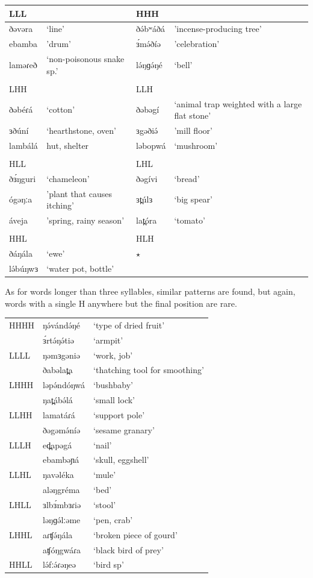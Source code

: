 \ea
\begin{supertabular}[t]{lllp{3.5cm}}
LLL	&	&	HHH\\\hline
ðəvəra	&	‘line’	&	ðə́bʷáðá	&	'incense-producing tree’\\
ebamba	&	'drum’	&	ɜ́mə́ðíə	&	'celebration'\\
laməɾeð	&	‘non-poisonous snake sp.' &	lə́ŋɡə́ŋé	&	‘bell’\\
&\\
LHH	&	&	LLH\\\hline
ðəbéɾá	&	‘cotton’	&	ðəbəgí	&‘animal trap weighted with a large flat stone’\\
ɜðúní	&	‘hearthstone, oven’	&	ɜgəðiə́	&	'mill floor'\\
lambálá	&hut, shelter	&	ləbopwá	&	‘mushroom’\\
&\\
HLL	&	&	LHL\\
ðɜ́ŋguri	&	‘chameleon’	&	ðəgívi	&	‘bread’\\
ógəŋːa	&	'plant that causes itching'	&	ɜt̪úlɜ	&	‘big spear’\\
áveja	&	'spring, rainy season'	&	lat̪óra	&	‘tomato’\\
&\\
HHL	&	&	HLH\\\hline
ðáŋála	&	‘ewe’	&	$\star$ &\\
lə́búŋwɜ	&	‘water pot, bottle’& &\\
\end{supertabular}
\z

As for words longer than three syllables, similar patterns are found, but again, words with a single H anywhere but the final position are rare. 

\ea
\begin{tabular}[t]{lll}
HHHH	&	ŋə́vándə́ŋé	&	‘type of dried fruit’\\
		&	ɜ́rtə́ŋə́tiə	&	‘armpit’\\
LLLL	&	ŋəmɜgəniə	&	‘work, job’\\
		&	ðabəlat̪a	&	‘thatching tool for smoothing’\\
LHHH	&	ləpə́ndóŋwá	&	‘bushbaby’\\
		&	ŋat̪ábə́lá		&	‘small lock’\\
LLHH	&	lamatáɾá	&	‘support pole’\\
		&	ðəgəmə́níə	&	‘sesame granary’\\
LLLH	&	ed̪apəgá		&	‘nail’\\
		&	ebambəɲá	&	‘skull, eggshell’\\
LLHL	&	ŋavəléka	&	‘mule’\\
		&	aləŋgréma	&	‘bed’\\
LHLL	&	ɜlbɜ́mbɜɾiə	&	‘stool’\\
		&	ləŋɡə́lːəme	&	‘pen, crab’\\
LHHL	&	aɾʧə́ŋála		&	‘broken piece of gourd’\\
		&	aʧóŋgwáɾa	&	‘black bird of prey’\\
HHLL	&	lə́fːə́ɾəŋeə	&	‘bird sp’\\
\end{tabular}
\z


